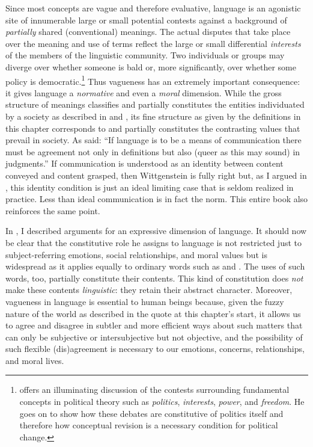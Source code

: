 Since most concepts are vague and therefore evaluative, language is an agonistic site of innumerable large or small potential contests against a background of \emph{partially} shared (conventional) meanings. The actual disputes that take place over the meaning and use of terms reflect the large or small differential \emph{interests} of the members of the linguistic community. Two individuals or groups may diverge over whether someone is bald or, more significantly, over whether some policy is democratic.\footnote{\citet{connolly:tpd} offers an illuminating discussion of the contests surrounding fundamental concepts in political theory such as \emph{politics}, \emph{interests}, \emph{power}, and \emph{freedom}. He goes on to show how these debates are constitutive of politics itself and therefore how conceptual revision is a necessary condition for political change.} Thus vagueness has an extremely important consequence: it gives language a \emph{normative} and even a \emph{moral} dimension. While the gross structure of meanings classifies and partially constitutes the entities individuated by a society as described in  and , its fine structure as given by the definitions in this chapter corresponds to and partially constitutes the contrasting values that prevail in society. As \citet[Section~242, 88]{wittgenstein:pi} said: ``If language is to be a means of communication there must be agreement not only in definitions but also (queer as this may sound) in judgments.'' If communication is understood as an identity between content conveyed and content grasped, then Wittgenstein is fully right but, as I argued in \citet{parikh:ul, parikh:rs, parikh:le}, this identity condition is just an ideal limiting case that is seldom realized in practice. Less than ideal communication is in fact the norm. This entire book also reinforces the same point.

In , I described  arguments for an expressive dimension of language. It should now be clear that the constitutive role he assigns to language is not restricted just to subject-referring emotions, social relationships, and moral values but is widespread as it applies equally to ordinary words such as  and . The uses of such words, too, partially constitute their contents. This kind of constitution does \emph{not} make these contents \emph{linguistic}: they retain their abstract character. Moreover, vagueness in language is essential to human beings because, given the fuzzy nature of the world as described in the quote at this chapter's start, it allows us to agree and disagree in subtler and more efficient ways about such matters that can only be subjective or intersubjective but not objective, and the possibility of such flexible (dis)agreement is necessary to our emotions, concerns, relationships, and moral lives.

